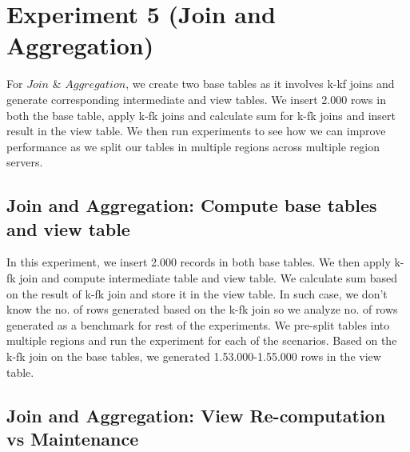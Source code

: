 \documentclass[11pt,a4paper,bibtotoc,idxtotoc,headsepline,footsepline,footexclude,BCOR12mm,DIV13]{scrbook}
\begin{document}
\section{Experiment 5 (Join and Aggregation)}
\label{(sec:Join and Aggregation Dist)} 
For $Join$ \& $Aggregation$, we create two base tables as it involves k-kf joins and generate corresponding intermediate and view tables. We insert 2.000 rows in both the base table, apply k-fk joins and calculate sum for k-fk joins and insert result in the view table. We then run experiments to see how we can improve performance as we split our tables in multiple regions across multiple region servers.

\subsection{Join and Aggregation: Compute base tables and view table}
\label{Join and Aggregation: Compute base tables and view table}
In this experiment, we insert 2.000 records in both base tables. We then apply k-fk join and compute intermediate table and view table. We calculate sum based on the result of k-fk join and store it in the view table. In such case, we don't know the no. of rows generated based on the k-fk join so we analyze no. of rows generated as a benchmark for rest of the experiments. We pre-split tables into multiple regions and run the experiment for each of the scenarios. Based on the k-fk join on the base tables, we generated 1.53.000-1.55.000 rows in the view table.


\subsection{Join and Aggregation: View Re-computation vs Maintenance}
\label{Join and Aggregation: View Re-computation vs Maintenance Distributed}
\end{document}
